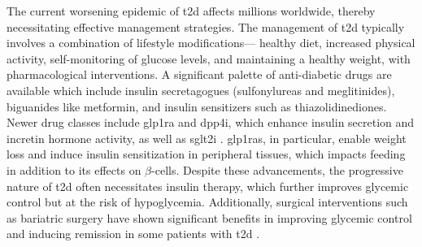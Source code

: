 \par The current worsening epidemic of \gls{t2d} affects millions worldwide, thereby necessitating effective management strategies. The management of \gls{t2d} typically involves a combination of lifestyle modifications— healthy diet, increased physical activity, self-monitoring of glucose levels, and maintaining a healthy weight, with pharmacological interventions. A significant palette of anti-diabetic drugs are available which include insulin secretagogues (sulfonylureas and meglitinides), biguanides like metformin, and insulin sensitizers such as thiazolidinediones. Newer drug classes include \gls{glp1ra} and \gls{dpp4i}, which enhance insulin secretion and incretin hormone activity, as well as \gls{sglt2i} \textbf{\cite{padhi_type_2020}}. \gls{glp1ra}s, in particular, enable weight loss and induce insulin sensitization in peripheral tissues, which impacts feeding in addition to its effects on $\beta$-cells. Despite these advancements, the progressive nature of \gls{t2d} often necessitates insulin therapy, which further improves glycemic control but at the risk of hypoglycemia. Additionally, surgical interventions such as bariatric surgery have shown significant benefits in improving glycemic control and inducing remission in some patients with \gls{t2d} \textbf{\cite{schauer_philip_r_bariatric_2014,schauer_philip_r_bariatric_2017,oppenlander_vertical_2021}}.\\



